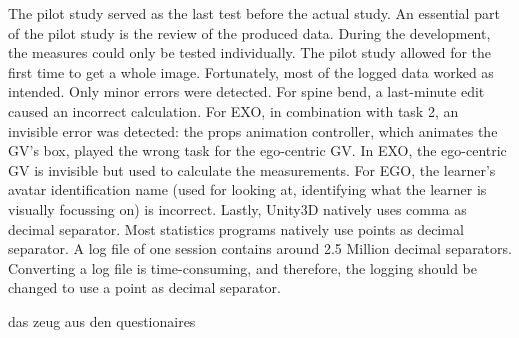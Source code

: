 The pilot study served as the last test before the actual study. An essential part of the pilot study is the review of the produced data. During the development, the measures could only be tested individually. The pilot study allowed for the first time to get a whole image. Fortunately, most of the logged data worked as intended. Only minor errors were detected. For spine bend, a last-minute edit caused an incorrect calculation. For EXO, in combination with task 2, an invisible error was detected: the props animation controller, which animates the GV's box, played the wrong task for the ego-centric GV. In EXO, the ego-centric GV is invisible but used to calculate the measurements. For EGO, the learner's avatar identification name (used for looking at, identifying what the learner is visually focussing on) is incorrect. Lastly, Unity3D natively uses comma as decimal separator. Most statistics programs natively use points as decimal separator. A log file of one session contains around 2.5 Million decimal separators. Converting a log file is time-consuming, and therefore, the logging should be changed to use a point as decimal separator.

das zeug aus den questionaires
